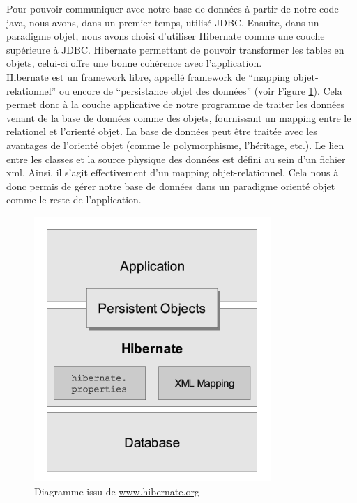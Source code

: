 Pour pouvoir communiquer avec notre base de données à partir de notre code java, nous avons, dans un premier temps, utilisé JDBC. Ensuite, dans un paradigme objet, nous avons  choisi d'utiliser Hibernate comme une couche supérieure à JDBC. Hibernate permettant de pouvoir transformer les tables en objets, celui-ci offre une bonne cohérence avec l'application.\\
\newline
\indent
Hibernate est un framework libre, appellé framework de  \enquote{mapping objet-relationnel} ou encore de \enquote{persistance objet des données} (voir Figure \ref{reference2}). 
\newline
\indent
Cela permet donc à la couche applicative de notre programme de traiter les données venant de la base de données comme des objets, fournissant un mapping entre le relationel et l'orienté objet.
\newline
\indent
 La base de données peut être traitée avec les avantages de l'orienté objet (comme le polymorphisme, l'héritage, etc.). Le lien entre les classes et la source physique des données  est défini au sein d'un fichier xml. Ainsi, il s'agit effectivement d'un mapping objet-relationnel.
 \newline
 \indent
Cela nous à donc permis de gérer notre base de données dans un paradigme orienté objet comme le reste de l'application.
\begin{figure}[!h]
    \center
   	\includegraphics[scale=0.65]{schema_hibernate.png}
   	\caption{Diagramme issu de \url{www.hibernate.org}}
    \label{reference2}
\end{figure}

